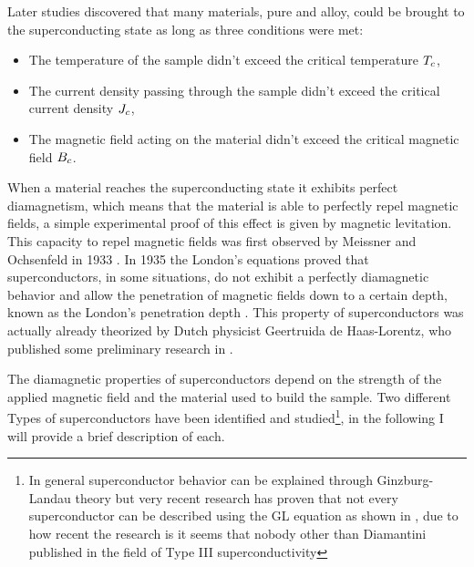 Later studies discovered that many materials, pure and alloy, could be brought to the
superconducting state as long as three conditions were met:
\begin{itemize}
	\item The temperature of the sample didn't exceed the critical temperature $T_c$,
	\item The current density passing through the sample didn't exceed the critical current
	      density $J_c$,
	\item The magnetic field acting on the material didn't exceed the critical magnetic field $B_c$.
\end{itemize}

When a material reaches the superconducting state it exhibits perfect diamagnetism, which means that
the material is able to perfectly repel magnetic fields, a simple experimental proof of this effect
is given by magnetic levitation. This capacity to repel magnetic fields was first observed by
Meissner and Ochsenfeld in 1933 \cite{meissner1933}. In 1935 the London's equations proved that
superconductors, in some situations, do not exhibit a perfectly diamagnetic behavior and allow the
penetration of magnetic fields down to a certain depth, known as the London's penetration depth
\cite{london1935}. This property of superconductors was actually already theorized by Dutch
physicist Geertruida de Haas-Lorentz, who published some preliminary research in
\cite{fokker1925physica}.

The diamagnetic properties of superconductors depend on the strength of the applied magnetic field
and the material used to build the sample. Two different Types of superconductors have been
identified and studied\footnote{In general superconductor behavior can be explained through
	Ginzburg-Landau theory \cite{Cyrot1973} but very recent research has proven that not every
	superconductor can be described using the GL equation as shown in
	\cite{diamantini2023typeiiisuperconductivity}, due to how recent the research is it seems
	that nobody other than Diamantini published in the field of Type III superconductivity}, in the following I will provide a brief description of each.

